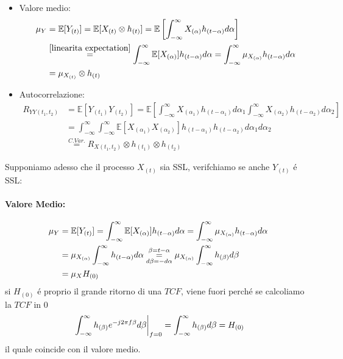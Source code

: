             \begin{itemize}
                \item {
                    Valore medio:
                    \begin{align}
                        \mu_Y &= \mathbb{E}[Y_{(t)}] =\mathbb{E}[X_{(t)} \otimes h_{(t)}] = \mathbb{E}\left[\int_{-\infty}^{\infty} X_{(\alpha)} h_{(t-\alpha)} d\alpha\right]\nonumber \\
                              &\overset{\ref{linearita expectation}}{=} \int_{-\infty}^{\infty} \mathbb{E}[X_{(\alpha)}] h_{(t-\alpha)} d\alpha = \int_{-\infty}^{\infty} \mu_{X_{(\alpha)}} h_{(t-\alpha)} d\alpha  \nonumber \\
                              &=  \mu_{X_{(t)}} \otimes h_{(t)}\nonumber
                    \end{align}
                }
                \item {
                    Autocorrelazione:
                    \begin{align}
                        R_{YY(t_1,t_2)} &= \mathbb{E}[Y_{(t_1)}Y_{(t_2)}] = \mathbb{E}\left[\int_{-\infty}^{\infty} X_{(\alpha_1)} h_{(t-\alpha_1)} d\alpha_1\int_{-\infty}^{\infty} X_{(\alpha_2)} h_{(t-\alpha_2)} d\alpha_2\right]\nonumber \\
                                        &= \int_{-\infty}^{\infty}\int_{-\infty}^{\infty} \mathbb{E}[X_{(\alpha_1)}X_{(\alpha_2)}] h_{(t-\alpha_1)} h_{(t-\alpha_2)} d\alpha_1d\alpha_2\nonumber \\
                                        &\overset{C. Var.}{=} R_{X(t_1,t_2)} \otimes h_{(t_1)}\otimes h_{(t_2)}\nonumber
                    \end{align}
                }
            \end{itemize}
            Supponiamo adesso che il processo $X_{(t)}$ sia SSL, verifchiamo se anche $Y_{(t)}$ é SSL:
            \paragraph{Valore Medio:}
                \begin{align}
                    \mu_Y &= \mathbb{E}[Y_{(t)}] = \int_{-\infty}^{\infty} \mathbb{E}[X_{(\alpha)}] h_{(t-\alpha)} d\alpha = \int_{-\infty}^{\infty} \mu_{X_{(\alpha)}} h_{(t-\alpha)} d\alpha \nonumber \\
                            &= \mu_{X_{(\alpha)}} \int_{-\infty}^{\infty} h_{(t-\alpha)} d\alpha \overunderset{\beta = t-\alpha}{d\beta = -d\alpha}{=} \mu_{X_{(\alpha)}} \int_{-\infty}^{\infty} h_{(\beta)} d\beta\nonumber \\
                            &= \mu_X H_{(0)}\nonumber
                \end{align}
                si $H_{(0)}$ é proprio il grande ritorno di una $TCF$, viene fuori perché se calcoliamo la $TCF$ in $0$
                \[
                    \eval*{\int_{-\infty}^{\infty} h_{(\beta)} e^{-j2\pi f\beta} d\beta}_{f = 0} = \int_{-\infty}^{\infty} h_{(\beta)} d\beta = H_{(0)}
                \]
                il quale coincide con il valore medio.
